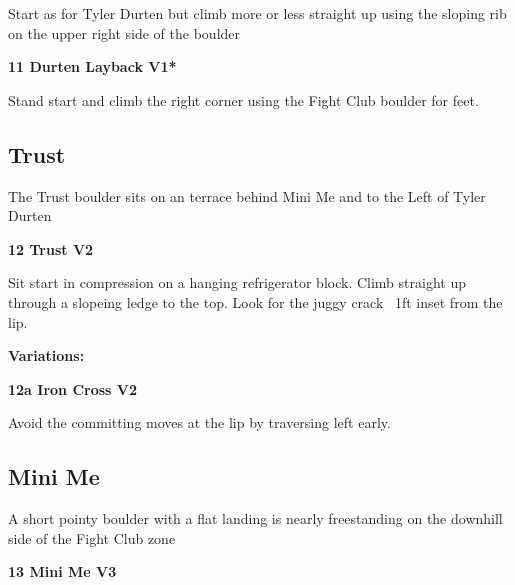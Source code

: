\begin{multicols}{2}
			\begin{adjustwidth}{0.5cm}{}				
			Start as for Tyler Durten but climb more or less straight up using the sloping rib on the upper right side of the boulder
			\end{adjustwidth}
			\label{rt:Durten Layback}
\colorbox{green!20}{
\parbox{0.95\linewidth}{
\textbf{
11 Durten Layback V1*  
}
}
}

			\begin{adjustwidth}{0.5cm}{}				
			Stand start and climb the right corner using the Fight Club boulder for feet.
			\end{adjustwidth}
		\subsection*{Trust}\label{bf:Trust}
		The Trust boulder sits on an terrace behind Mini Me and to the Left of Tyler Durten\\
	

			\label{rt:Trust}
\colorbox{green!20}{
\parbox{0.95\linewidth}{
\textbf{
12 Trust V2  
}
}
}

			\begin{adjustwidth}{0.5cm}{}				
			Sit start in compression on a hanging refrigerator block. Climb straight up through a slopeing ledge to the top. Look for the juggy crack ~1ft inset from the lip.
			\end{adjustwidth}
				\begin{adjustwidth}{0.5cm}{}				
				\textbf{Variations:} \newline
					\label{vr:Iron Cross}
\colorbox{green!20}{
\parbox{0.95\linewidth}{
\textbf{
12a Iron Cross V2  
}
}
}

					\begin{adjustwidth}{0.5cm}{}				
					Avoid the committing moves at the lip by traversing left early.
					\end{adjustwidth}
				\end{adjustwidth}
		\subsection*{Mini Me}\label{bf:Mini Me}
		A short pointy boulder with a flat landing is nearly freestanding on the downhill side of the Fight Club zone\\
	
			\label{rt:Mini Me}
\colorbox{green!20}{
\parbox{0.95\linewidth}{
\textbf{
13 Mini Me V3  
}
}
}


\end{multicols}
